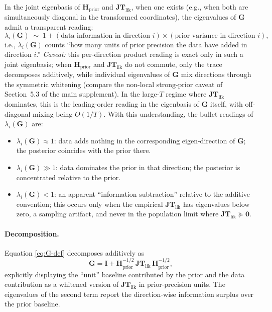 \documentclass[11pt]{article}
\begin{document}
In the joint eigenbasis of $\mathbf H_{\mathrm{prior}}$ and $\mathbf{JT}_{\mathrm{lik}}$, when one exists (e.g., when both are simultaneously diagonal in the transformed coordinates), the eigenvalues of $\mathbf G$ admit a transparent reading:
\begin{equation}
\lambda_i(\mathbf G)
\;\sim\;
1 + (\text{data information in direction } i) \times (\text{prior variance in direction } i),
\label{eq:G-eigenvalue-interp}
\end{equation}
i.e., $\lambda_i(\mathbf G)$ counts ``how many units of prior precision the data have added in direction $i$.'' \emph{Caveat:} this per-direction product reading is exact only in such a joint eigenbasis; when $\mathbf H_{\mathrm{prior}}$ and $\mathbf{JT}_{\mathrm{lik}}$ do not commute, only the trace decomposes additively, while individual eigenvalues of $\mathbf G$ mix directions through the symmetric whitening (compare the non-local strong-prior caveat of Section~5.3 of the main supplement). In the large-$T$ regime where $\mathbf{JT}_{\mathrm{lik}}$ dominates, this is the leading-order reading in the eigenbasis of $\mathbf G$ itself, with off-diagonal mixing being $O(1/T)$. With this understanding, the bullet readings of $\lambda_i(\mathbf G)$ are:
\begin{itemize}
\item $\lambda_i(\mathbf G) \approx 1$: data adds nothing in the corresponding eigen-direction of $\mathbf G$; the posterior coincides with the prior there.
\item $\lambda_i(\mathbf G) \gg 1$: data dominates the prior in that direction; the posterior is concentrated relative to the prior.
\item $\lambda_i(\mathbf G) < 1$: an apparent ``information subtraction'' relative to the additive convention; this occurs only when the empirical $\mathbf{JT}_{\mathrm{lik}}$ has eigenvalues below zero, a sampling artifact, and never in the population limit where $\mathbf{JT}_{\mathrm{lik}} \succeq \mathbf 0$.
\end{itemize}

\paragraph{Decomposition.}
Equation \eqref{eq:G-def} decomposes additively as
\begin{equation}
\mathbf G
=
\mathbf I + \mathbf H_{\mathrm{prior}}^{-1/2}\, \mathbf{JT}_{\mathrm{lik}}\, \mathbf H_{\mathrm{prior}}^{-1/2},
\label{eq:G-decomp}
\end{equation}
explicitly displaying the ``unit'' baseline contributed by the prior and the data contribution as a whitened version of $\mathbf{JT}_{\mathrm{lik}}$ in prior-precision units. The eigenvalues of the second term report the direction-wise information surplus over the prior baseline.
\end{document}
